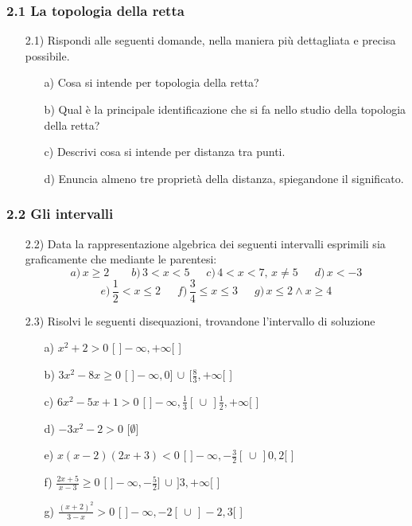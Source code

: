   \subsubsection*{2.1 La topologia della retta}
  \begin{itemize}
  \item[2.1)] Rispondi alle seguenti domande, 
nella maniera più dettagliata e precisa possibile.
  \begin{itemize}
  \item[a)] Cosa si intende per 
topologia della retta?
  \item [b)] Qual è la 
principale identificazione che si fa nello studio della topologia della retta?
  \item[c)] Descrivi cosa si 
intende per distanza tra punti.
  \item[d)] Enuncia almeno tre 
proprietà della distanza, spiegandone il significato.
  \end{itemize}   
  \end{itemize}
  \subsubsection*{2.2 Gli intervalli}
  \begin{itemize}
  \item[2.2)] Data la rappresentazione algebrica 
dei seguenti intervalli esprimili sia graficamente che mediante le parentesi:
\[a)\, x\geq2\,\,\, \,\,\, \,\,\, \,\,\, b)\, 3<x<5  \,\,\,\,\,\, \,\,\,   
c)\, 4<x<7,\, x\neq5  \,\,\,  \,\,\, \,\,\,  d)\, x<-3 \]
\[ e) \, \frac{1}{2}<x\leq2 \,\,\, \,\,\,  \,\,\,  f)\, \frac{3}{4}\leq 
x\leq3\,\,\, \,\,\, \,\,\,  g)\, x\leq2\land x\geq4\]

  \item[2.3)] Risolvi le seguenti disequazioni, 
trovandone l'intervallo di soluzione
  \begin{itemize}
  \item[a)] \(x^2+2>0\)  
   \hfill  [ \(]-\infty,+\infty[\) ]
  \item[b)] \(3x^2-8x\geq0\)   
   \hfill   [ \(]-\infty,0]\,\cup\,[\frac{8}{3},+\infty[\) 
 ]
  \item[c)] \(6x^2-5x+1>0\)  
  \hfill   [ \(]-\infty, 
\frac{1}{3}[\,\cup\,]\frac{1}{2}, +\infty[\)  ]
  \item[d)] \(-3x^2-2>0\)  
  \hfill   [\(\emptyset\)]
  \item[e)] \(x(x-2)(2x+3)<0\)   
   \hfill   [ \(]-\infty, -\frac{3}{2}[\,\cup\, ]0, 2[\) ]
  \item[f)] 
\(\frac{2x+5}{x-3}\geq0\)   \hfill   [ \( 
]-\infty,-\frac{5}{2}]\,\cup\,]3,+\infty[\) ]
  \item[g)] 
\(\frac{(x+2)^2}{3-x}>0\)  \hfill   [ \( ]-\infty, 
-2[\,\cup\,]-2, 3[\) ]
  \end{itemize}
  \end{itemize}   
